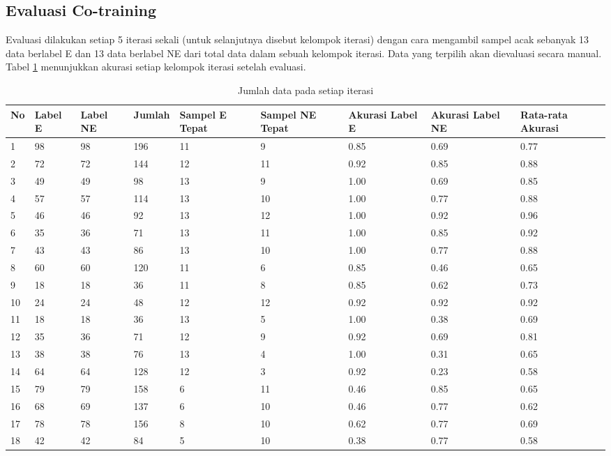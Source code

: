 \subsection{Evaluasi Co-training}
Evaluasi dilakukan setiap 5 iterasi sekali (untuk selanjutnya disebut kelompok iterasi) dengan cara mengambil sampel acak sebanyak 13 data berlabel E dan 13 data berlabel NE dari total data dalam sebuah kelompok iterasi. Data yang terpilih akan dievaluasi secara manual.  Tabel \ref{table:akurasi-iterasi} menunjukkan akurasi setiap kelompok iterasi setelah evaluasi.
\begin{table}
	\centering
	\caption{Jumlah data pada setiap iterasi}
	\label{table:akurasi-iterasi}
	\begin{tabular}{|p{0.6cm}|p{0.9cm}|p{0.9cm}|p{1.1cm}|p{1.2cm}|p{1.2cm}|p{1.2cm}|p{1.2cm}|p{1.7cm}|}
		\hline
		No & Label E & Label NE & Jumlah & Sampel E Tepat & Sampel NE Tepat & Akurasi Label E & Akurasi Label NE & Rata-rata Akurasi \\ \hline
		1 & 98 & 98 & 196 & 11 & 9 & 0.85 & 0.69 & 0.77 \\ \hline
		2 & 72 & 72 & 144 & 12 & 11 & 0.92 & 0.85 & 0.88 \\ \hline
		3 & 49 & 49 & 98 & 13 & 9 & 1.00 & 0.69 & 0.85 \\ \hline
		4 & 57 & 57 & 114 & 13 & 10 & 1.00 & 0.77 & 0.88 \\ \hline
		5 & 46 & 46 & 92 & 13 & 12 & 1.00 & 0.92 & 0.96 \\ \hline
		6 & 35 & 36 & 71 & 13 & 11 & 1.00 & 0.85 & 0.92 \\ \hline
		7 & 43 & 43 & 86 & 13 & 10 & 1.00 & 0.77 & 0.88 \\ \hline
		8 & 60 & 60 & 120 & 11 & 6 & 0.85 & 0.46 & 0.65 \\ \hline
		9 & 18 & 18 & 36 & 11 & 8 & 0.85 & 0.62 & 0.73 \\ \hline
		10 & 24 & 24 & 48 & 12 & 12 & 0.92 & 0.92 & 0.92 \\ \hline
		11 & 18 & 18 & 36 & 13 & 5 & 1.00 & 0.38 & 0.69 \\ \hline
		12 & 35 & 36 & 71 & 12 & 9 & 0.92 & 0.69 & 0.81 \\ \hline
		13 & 38 & 38 & 76 & 13 & 4 & 1.00 & 0.31 & 0.65 \\ \hline
		14 & 64 & 64 & 128 & 12 & 3 & 0.92 & 0.23 & 0.58 \\ \hline
		15 & 79 & 79 & 158 & 6 & 11 & 0.46 & 0.85 & 0.65 \\ \hline
		16 & 68 & 69 & 137 & 6 & 10 & 0.46 & 0.77 & 0.62 \\ \hline
		17 & 78 & 78 & 156 & 8 & 10 & 0.62 & 0.77 & 0.69 \\ \hline
		18 & 42 & 42 & 84 & 5 & 10 & 0.38 & 0.77 & 0.58 \\ \hline
	\end{tabular}
\end{table}
